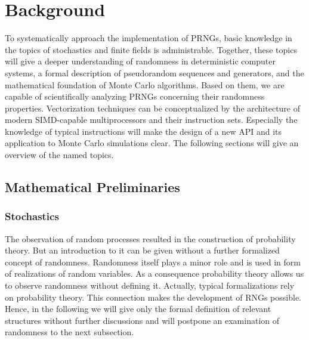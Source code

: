 \documentclass{stdlocal}
\begin{document}
\section{Background} %
\label{sec:background}
  To systematically approach the implementation of PRNGs, basic knowledge in the topics of stochastics and finite fields is administrable.
  Together, these topics will give a deeper understanding of randomness in deterministic computer systems, a formal description of pseudorandom sequences and generators, and the mathematical foundation of Monte Carlo algorithms.
  Based on them, we are capable of scientifically analyzing PRNGs concerning their randomness properties.
  Vectorization techniques can be conceptualized by the architecture of modern SIMD-capable multiprocessors and their instruction sets.
  Especially the knowledge of typical instructions will make the design of a new API and its application to Monte Carlo simulations clear.
  The following sections will give an overview of the named topics.

  \subsection{Mathematical Preliminaries} %
  \label{sub:mathematical_preliminaries}
    \subsubsection*{Stochastics} %
    \label{ssub:stochastics}
      The observation of random processes resulted in the construction of probability theory.
      But an introduction to it can be given without a further formalized concept of randomness.
      Randomness itself plays a minor role and is used in form of realizations of random variables.
      As a consequence probability theory allows us to observe randomness without defining it.
      Actually, typical formalizations rely on probability theory.
      This connection makes the development of RNGs possible.
      Hence, in the following we will give only the formal definition of relevant structures without further discussions and will postpone an examination of randomness to the next subsection.
\end{document}
